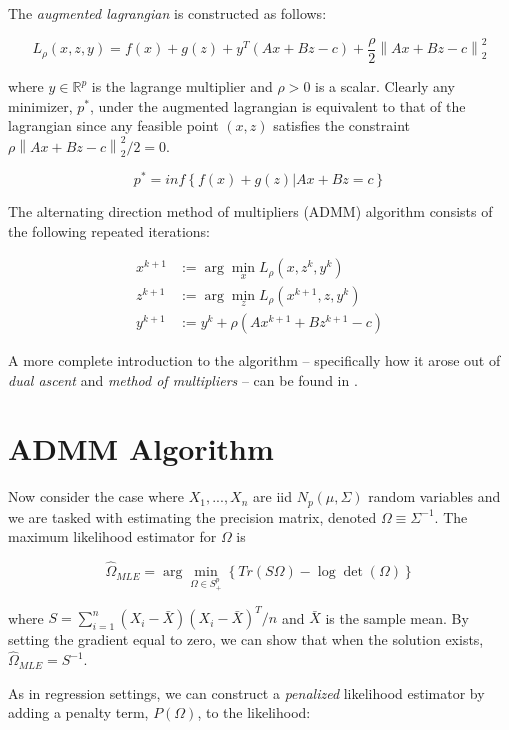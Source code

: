 \documentclass[12pt,]{book}
\theoremstyle{definition}
\theoremstyle{definition}
\theoremstyle{definition}
\theoremstyle{remark}
\begin{document}
The \emph{augmented lagrangian} is constructed as follows:

\[ L_{\rho}(x, z, y) = f(x) + g(z) + y^{T}(Ax + Bz - c) + \frac{\rho}{2}\left\| Ax + Bz - c \right\|_{2}^{2} \]

where \(y \in \mathbb{R}^{p}\) is the lagrange multiplier and
\(\rho > 0\) is a scalar. Clearly any minimizer, \(p^{*}\), under the
augmented lagrangian is equivalent to that of the lagrangian since any
feasible point \((x, z)\) satisfies the constraint
\(\rho\left\| Ax + Bz - c \right\|_{2}^{2}/2 = 0\).

\[ p^{*} = inf\left\{ f(x) + g(z) | Ax + Bz = c \right\} \]

The alternating direction method of multipliers (ADMM) algorithm
consists of the following repeated iterations:

\begin{align}
  x^{k + 1} &:= \arg\min_{x}L_{\rho}(x, z^{k}, y^{k}) \\
  z^{k + 1} &:= \arg\min_{z}L_{\rho}(x^{k + 1}, z, y^{k}) \\
  y^{k + 1} &:= y^{k} + \rho(Ax^{k + 1} + Bz^{k + 1} - c)
\end{align}

A more complete introduction to the algorithm -- specifically how it
arose out of \emph{dual ascent} and \emph{method of multipliers} -- can
be found in \citet{boyd2011distributed}.

\vspace{1cm}

\hypertarget{admm-algorithm}{%
\section{ADMM Algorithm}\label{admm-algorithm}}

Now consider the case where \(X_{1}, ..., X_{n}\) are iid
\(N_{p}(\mu, \Sigma)\) random variables and we are tasked with
estimating the precision matrix, denoted \(\Omega \equiv \Sigma^{-1}\).
The maximum likelihood estimator for \(\Omega\) is

\[ \hat{\Omega}_{MLE} = \arg\min_{\Omega \in S_{+}^{p}}\left\{ Tr\left(S\Omega\right) - \log \det\left(\Omega \right) \right\} \]

where \(S = \sum_{i = 1}^{n}(X_{i} - \bar{X})(X_{i} - \bar{X})^{T}/n\)
and \(\bar{X}\) is the sample mean. By setting the gradient equal to
zero, we can show that when the solution exists,
\(\hat{\Omega}_{MLE} = S^{-1}\).

As in regression settings, we can construct a \emph{penalized}
likelihood estimator by adding a penalty term,
\(P\left( \Omega \right)\), to the likelihood:
\end{document}
